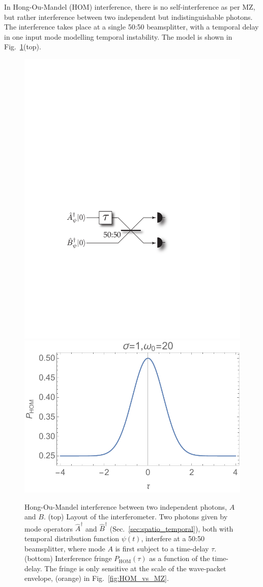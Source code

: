In Hong-Ou-Mandel (HOM) interference, there is no self-interference as per MZ, but rather interference between two independent but indistinguishable photons. The interference takes place at a single 50:50 beamsplitter, with a temporal delay in one input mode modelling temporal instability. The model is shown in Fig.~\ref{fig:HOM_inter}(top).

\begin{figure}[!htb]
	\includegraphics[width=0.63\columnwidth]{HOM_setup} \\
	\includegraphics[width=\columnwidth]{HOM}
	\caption{Hong-Ou-Mandel interference between two independent photons, $A$ and $B$. (top) Layout of the interferometer. Two photons given by mode operators $\hat{A}^\dag$ and $\hat{B}^\dag$ (Sec.~\ref{sec:spatio_temporal}), both with temporal distribution function $\psi(t)$, interfere at a 50:50 beamsplitter, where mode $A$ is first subject to a time-delay $\tau$. (bottom) Interference fringe $P_\text{HOM}(\tau)$ as a function of the time-delay. The fringe is only sensitive at the scale of the wave-packet envelope, (orange) in Fig.~\ref{fig:HOM_vs_MZ}.} \label{fig:HOM_inter}
\end{figure}

